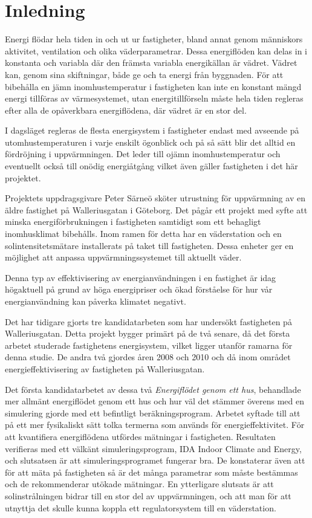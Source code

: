 \chapter{Inledning}

Energi flödar hela tiden in och ut ur fastigheter, bland annat genom människors aktivitet, ventilation och olika väderparametrar. Dessa energiflöden kan delas in i konstanta och variabla där den främsta variabla energikällan är vädret. Vädret kan, genom sina skiftningar, både ge och ta energi från byggnaden. För att bibehålla en jämn inomhustemperatur i fastigheten kan inte en konstant mängd energi tillföras av värmesystemet, utan energitillförseln måste hela tiden regleras efter alla de opåverkbara energiflödena, där vädret är en stor del.

I dagsläget regleras de flesta energisystem i fastigheter endast med avseende på utomhustemperaturen i varje enskilt ögonblick och på så sätt blir det alltid en fördröjning i uppvärmningen. Det leder till ojämn inomhustemperatur och eventuellt också till onödig energiåtgång vilket även gäller fastigheten i det här projektet.

Projektets uppdragsgivare Peter Särneö sköter utrustning för uppvärmning av en äldre fastighet på Walleriusgatan i Göteborg. Det pågår ett projekt med syfte att minska energiförbrukningen i fastigheten samtidigt som ett behagligt inomhusklimat bibehålls. Inom ramen för detta har en väderstation och en solintensitetsmätare installerats på taket till fastigheten. Dessa enheter ger en möjlighet att anpassa uppvärmningssystemet till aktuellt  väder. %

Denna typ av effektivisering av energianvändningen i en fastighet är idag högaktuell på grund av höga energipriser och ökad förståelse för hur vår energianvändning kan påverka klimatet negativt.

Det har tidigare gjorts tre kandidatarbeten som har undersökt fastigheten på Walleriusgatan. Detta projekt bygger primärt på de två senare, då det första arbetet studerade fastighetens energisystem, vilket ligger utanför ramarna för denna studie. De andra två gjordes åren 2008 och 2010 och då inom området energieffektivisering av fastigheten på Walleriusgatan. 

Det första kandidatarbetet av dessa två \textit{Energiflödet genom ett hus}\cite{kandidatarbete2008},
behandlade mer allmänt energiflödet genom ett hus och hur väl det stämmer
överens med en simulering gjorde med ett befintligt beräkningsprogram. Arbetet syftade
till att på ett mer fysikaliskt sätt tolka termerna som används för
energieffektivitet. För att kvantifiera energiflödena utfördes mätningar i
fastigheten. Resultaten verifieras med ett välkänt simuleringsprogram,
IDA Indoor Climate and Energy, och slutsatsen är att simuleringsprogramet fungerar bra.
De konstaterar även att för att mäta på fastigheten så är det många parametrar som
måste bestämmas och de rekommenderar utökade mätningar.
 En ytterligare slutsats är att solinstrålningen bidrar till en stor del av
uppvärmningen, och att man för att utnyttja det skulle kunna koppla ett
regulatorsystem till en väderstation.

